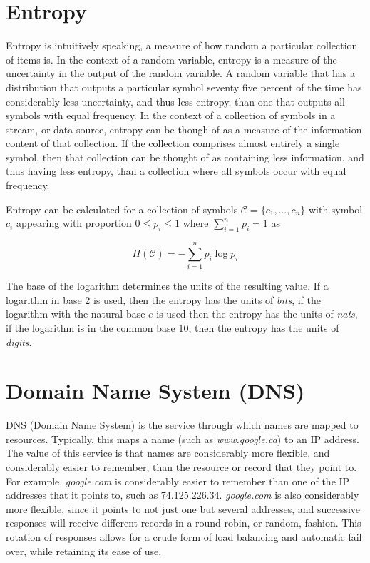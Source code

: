 \documentclass[12pt]{report}
\theoremstyle{remark}
\theoremstyle{definition}
\theoremstyle{definition}
\theoremstyle{definition}
\begin{document}
\section{Entropy}
Entropy is intuitively speaking, a measure of how random a particular collection
of items is. In the context of a random variable, entropy is a measure of the
uncertainty in the output of the random variable. A random variable that has a
distribution that outputs a particular symbol seventy five percent of the time
has considerably less uncertainty, and thus less entropy, than one that outputs
all symbols with equal frequency. In the context of a collection of symbols in a
stream, or data source, entropy can be though of as a measure of the information
content of that collection. If the collection comprises almost entirely a single
symbol, then that collection can be thought of as containing less information,
and thus having less entropy, than a collection where all symbols occur with
equal frequency.

Entropy can be calculated for a collection of symbols
$\mathcal{C}=\{c_1,\ldots,c_n\}$ with symbol $c_i$ appearing with proportion
$0\leq p_i\leq 1$ where $\sum_{i=1}^n{p_i}=1$ as

 \[H(\mathcal{C})=-\sum_{i=1}^n{p_i \log{p_i}}\]

The base of the logarithm determines the units of the resulting value. If a
logarithm in base 2 is used, then the entropy has the units of \emph{bits}, if
the logarithm with the natural base $e$ is used then the entropy has the units
of \emph{nats}, if the logarithm is in the common base 10, then the entropy has
the units of \emph{digits}.

\section{Domain Name System (DNS)}

DNS (Domain Name System) is the service through which names are mapped to
resources. Typically, this maps a name (such as \emph{www.google.ca}) to an IP
address. The value of this service is that names are considerably more
flexible, and considerably easier to remember, than the resource or record that
they point to. For example, \emph{google.com} is considerably
easier to remember than one of the IP addresses that it points to, such as
74.125.226.34. \emph{google.com} is also considerably more flexible, since it
points to not just one but several addresses, and successive responses
will receive different records in a round-robin, or random, fashion. This
rotation of responses allows for a crude form of load balancing and automatic
fail over, while retaining its ease of use.
\end{document}

